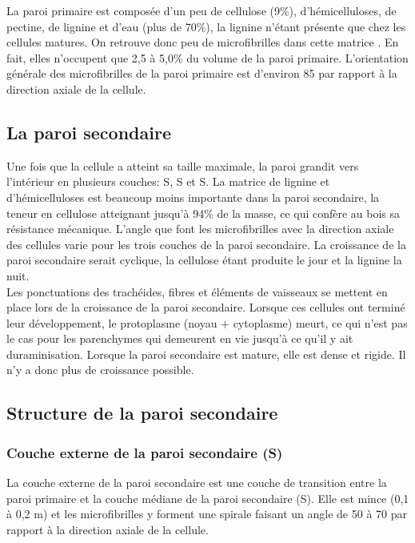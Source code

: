 La paroi primaire est composée d'un peu de cellulose (9\%), d'hémicelluloses, de pectine, de lignine et d'eau (plus de 70\%), la lignine n'étant présente que chez les cellules matures. On retrouve donc peu de microfibrilles dans cette \og matrice \fg. En fait, elles n'occupent que 2,5 à 5,0\% du volume de la paroi primaire. L'orientation générale des microfibrilles de la paroi primaire est d'environ 85 par rapport à la direction axiale de la cellule.

\subsection{La paroi secondaire}

Une fois que la cellule a atteint sa taille maximale, la paroi \og grandit \fg vers l'intérieur en plusieurs couches: S, S et S. La matrice de lignine et d'hémicelluloses est beaucoup moins importante dans la paroi secondaire, la teneur en cellulose atteignant jusqu'à 94\% de la masse, ce qui confère au bois sa résistance mécanique. L'angle que font les microfibrilles avec la direction axiale des cellules varie pour les trois couches de la paroi secondaire. La croissance de la paroi secondaire serait cyclique, la cellulose étant produite le jour et la lignine la nuit.\\

Les ponctuations des trachéides, fibres et éléments de vaisseaux se mettent en place lors de la croissance de la paroi secondaire. Lorsque ces cellules ont terminé leur développement, le protoplasme (noyau + cytoplasme) meurt, ce qui n'est pas le cas pour les parenchymes qui demeurent en vie jusqu'à ce qu'il y ait duraminisation. Lorsque la paroi secondaire est mature, elle est dense et rigide. Il n'y a donc plus de croissance possible.

\subsection{Structure de la paroi secondaire}

\subsubsection{Couche externe de la paroi secondaire (S)}

La couche externe de la paroi secondaire est une couche de transition entre la paroi primaire et la couche médiane de la paroi secondaire (S). Elle est mince (0,1 à 0,2 \micro m) et les microfibrilles y forment une spirale faisant un angle de 50 à 70\textdegree{} par rapport à la direction axiale de la cellule.

